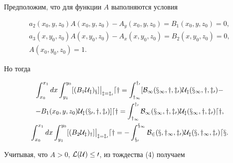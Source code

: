  


Предположим, что для функции $A$ выполняются условия 


\begin{gather*} 


a_2(x_0,y,z_0)A(x_0,y,z_0)- 


A_y(x_0,y,z_0)=B_1(x_0,y,z_0)=0,\\ 


a_3(x,y_0,z_0)A(x,y_0,z_0)- 


A_x(x,y_0,z_0)=B_2(x,y_0,z_0)=0,\\ 


A(x_0,y_0,z_0)=1. 


\end{gather*} 


Но тогда 


\begin{gather*} 


\int^{x_1}_{x_0}dx\int^{y_0}_{y_1}[(B_1\cal U_z)_x]\big|_{z=z_0}dy= 


\int^{y_0}_{y_1}[B_1(x_1,y,z_0)\cal U_z(x_1,y,z_0)- \\


- B_1(x_0,y,z_0)\cal U_z(x_0,y,z_0)]dy= 


\int^{y_0}_{y_1}B_1(x_1,y,z_0)\cal U_z(x_1,y,z_0)dy,\\ 


% 


\int^{x_1}_{x_0}dx\int^{y_0}_{y_1}[(B_2\cal U_z)_y]\big|_{z=z_0}dy= 


-\int^{x_1}_{x_0}B_2(x,y_1,z_0)\cal U_z(x,y_1,z_0)dx.


\end{gather*} 


Учитывая, что $A>0$, $\cal L(\cal U)\le0$, из тождества (4) получаем 


